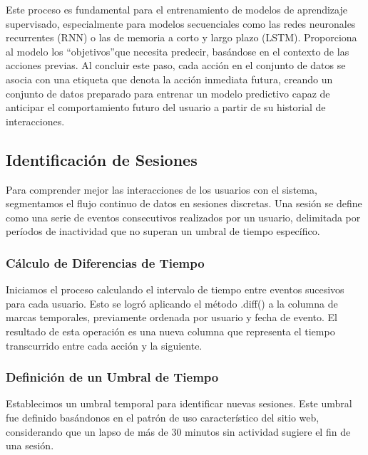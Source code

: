 Este proceso es fundamental para el entrenamiento de modelos de aprendizaje supervisado, especialmente para modelos secuenciales como las redes neuronales recurrentes (RNN) o las de memoria a corto y largo plazo (LSTM). Proporciona al modelo los \textquotedblleft objetivos\textquotedblright que necesita predecir, basándose en el contexto de las acciones previas. Al concluir este paso, cada acción en el conjunto de datos se asocia con una etiqueta que denota la acción inmediata futura, creando un conjunto de datos preparado para entrenar un modelo predictivo capaz de anticipar el comportamiento futuro del usuario a partir de su historial de interacciones.

\subsection{Identificación de Sesiones}

Para comprender mejor las interacciones de los usuarios con el sistema, segmentamos el flujo continuo de datos en sesiones discretas. Una sesión se define como una serie de eventos consecutivos realizados por un usuario, delimitada por períodos de inactividad que no superan un umbral de tiempo específico.

\subsubsection{Cálculo de Diferencias de Tiempo} 
Iniciamos el proceso calculando el intervalo de tiempo entre eventos sucesivos para cada usuario. Esto se logró aplicando el método .diff() a la columna de marcas temporales, previamente ordenada por usuario y fecha de evento. El resultado de esta operación es una nueva columna que representa el tiempo transcurrido entre cada acción y la siguiente.

\subsubsection{Definición de un Umbral de Tiempo} 
Establecimos un umbral temporal para identificar nuevas sesiones. Este umbral fue definido basándonos en el patrón de uso característico del sitio web, considerando que un lapso de más de 30 minutos sin actividad sugiere el fin de una sesión.


